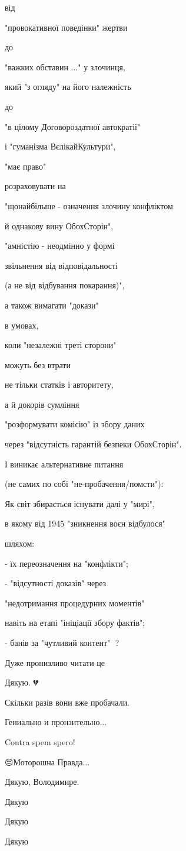 \begin{multicols}{2}
\begin{itemize}
від

"провокативної поведінки" жертви

до

"важких обставин ..." у злочинця,

який "з огляду" на його належність

до

"в цілому Договороздатної автократії"

і "гуманізма ВєлікайКультури",

"має право"

розраховувати на

"щонайбільше - означення злочину конфліктом

й однакову вину ОбохСторін",

"амністію - неодмінно у формі

звільнення від відповідальності

(а не від відбування покарання)",

а також вимагати "докази"

в умовах,

коли "незалежні треті сторони"

можуть без втрати

не тільки статків і авторитету,

а й докорів сумління

"розформувати комісію" із збору даних

через "відсутність гарантій безпеки ОбохСторін".

І виникає альтернативне питання

(не самих по собі "не-пробачення/помсти"):

Як світ збирається існувати далі у "мирі",

в якому від 1945 "зникнення воєн відбулося"

шляхом:

- їх переозначення на "конфлікти";

- "відсутності доказів" через

"недотримання процедурних моментів"

навіть на етапі "ініціації збору фактів";

- банів за "чутливий контент" 🤔?


Дуже пронизливо читати це

Дякую. 💔

Скільки разів вони вже пробачали.

Гениально и пронзительно...

Contra spem spero!

😔Моторошна Правда...

Дякую, Володимире.

Дякую

Дякую

Дякую

\end{itemize} %

\end{multicols} %
